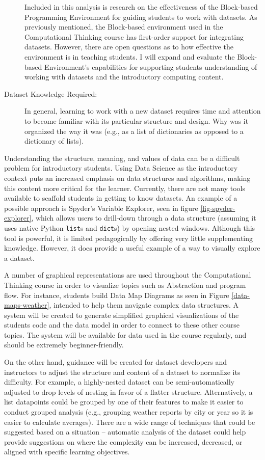 \begin{description}
		Included in this analysis is research on the effectiveness of the Block-based Programming Environment for guiding students to work with datasets.
		As previously mentioned, the Block-based environment used in the Computational Thinking course has first-order support for integrating datasets. However, there are open questions as to how effective the environment is in teaching students.
		I will expand and evaluate the Block-based Environment's capabilities for supporting students understanding of working with datasets and the introductory computing content.
		
		\item[Dataset Knowledge Required:] In general, learning to work with a new dataset requires time and attention to become familiar with its particular structure and design. Why was it organized the way it was (e.g., as a list of dictionaries as opposed to a dictionary of lists).
	\end{description}
		Understanding the structure, meaning, and values of data can be a difficult problem for introductory students.
		Using Data Science as the introductory context puts an increased emphasis on data structures and algorithms, making this content more critical for the learner.
		Currently, there are not many tools available to scaffold students in getting to know datasets.
		An example of a possible approach is Spyder's Variable Explorer, seen in figure \ref{fig-spyder-explorer}, which allows users to drill-down through a data structure (assuming it uses native Python \texttt{list}s and \texttt{dict}s) by opening nested windows. 
		Although this tool is powerful, it is limited pedagogically by offering very little supplementing knowledge.
		However, it does provide a useful example of a way to visually explore a dataset.

		A number of graphical representations are used throughout the Computational Thinking course in order to visualize topics such as Abstraction and program flow.
		For instance, students build Data Map Diagrams as seen in Figure \ref{data-maps-weather}, intended to help them navigate complex data structures.
		A system will be created to generate simplified graphical visualizations of the students code and the data model in order to connect to these other course topics.
		The system will be available for data used in the course regularly, and should be extremely beginner-friendly.
		
		On the other hand, guidance will be created for dataset developers and instructors to adjust the structure and content of a dataset to normalize its difficulty.
		For example, a highly-nested dataset can be semi-automatically adjusted to drop levels of nesting in favor of a flatter structure.
		Alternatively, a list datapoints could be grouped by one of their features to make it easier to conduct grouped analysis (e.g., grouping weather reports by city or year so it is easier to calculate averages).
		There are a wide range of techniques that could be suggested based on a situation -- automatic analysis of the dataset could help provide suggestions on where the complexity can be increased, decreased, or aligned with specific learning objectives. 
		
